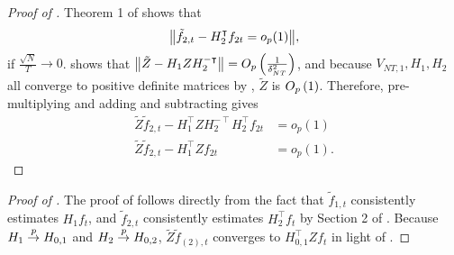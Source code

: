 \documentclass[12pt]{article}
\newcommand*{\tran}{\intercal}
\theoremstyle{plain}
\numberwithin{equation}{section}
\begin{document}
\begin{proof}[Proof of ]
Theorem 1 of \textcite{bai_inferential_2003} shows that
\begin{align*}
\norm{
	\tilde{f}_{2, t} - H_2^\tran f_{2t} = o_p(1)
},
\end{align*}
if $\frac{\sqrt{N}}{T} \to 0$.  shows that $\norm{\tilde{Z} - H_1 Z H_2^{-\tran}} = \Opdeltasq$, and because $V_{NT, 1}, H_1, H_2$ all converge to positive definite matrices by , $\tilde{Z}$ is $O_p \left( 1 \right)$. Therefore, pre-multiplying and adding and subtracting gives
\begin{align*}
\tilde{Z} \tilde{f}_{2, t} - 
H_1^\tran Z H_2^{-\tran} H_2^\tran f_{2t} &= o_p(1) \\
\tilde{Z} \tilde{f}_{2, t} - 
H_1^\tran Z f_{2t} &= o_p(1).
\end{align*}
\end{proof}

\begin{proof}[Proof of ]
The proof of  follows directly from the fact that $\tilde{f}_{1, t}$ consistently estimates $H_1 f_{t}$, and $\tilde{f}_{2, t}$ consistently estimates $H_2^\tran f_{t}$ by Section 2 of  \textcite{bai_inferential_2003}. Because $H_1 \overset{p}{\to} H_{0, 1}$ and $H_2 \overset{p}{\to} H_{0, 2}$, $\tilde{Z} \tilde{f}_{(2), t}$ converges to $H_{0, 1}^\tran Z f_t$ in light of .
\end{proof}
\end{document}
